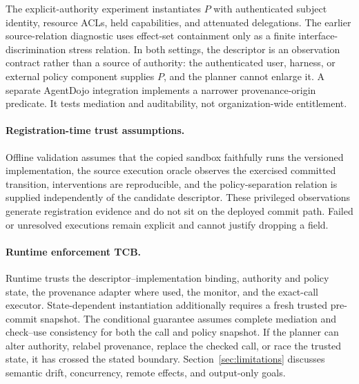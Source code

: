 The explicit-authority experiment instantiates $P$ with authenticated subject
identity, resource ACLs, held capabilities, and attenuated delegations. The
earlier source-relation diagnostic uses effect-set containment only as a finite
interface-discrimination stress relation. In both settings, the descriptor is
an observation contract rather than a source of authority: the authenticated
user, harness, or external policy component supplies $P$, and the planner
cannot enlarge it. A separate AgentDojo integration implements a narrower
provenance-origin predicate. It tests mediation and auditability, not
organization-wide entitlement.

\paragraph{Registration-time trust assumptions.}
Offline validation assumes that the copied sandbox faithfully runs the
versioned implementation, the source execution oracle observes the exercised
committed transition, interventions are reproducible, and the
policy-separation relation is supplied independently of the candidate
descriptor. These privileged observations generate registration evidence and
do not sit on the deployed commit path. Failed or unresolved executions remain
explicit and cannot justify dropping a field.

\paragraph{Runtime enforcement TCB.}
Runtime trusts the descriptor--implementation binding, authority and policy
state, the provenance adapter where used, the monitor, and the exact-call
executor. State-dependent instantiation additionally requires a fresh trusted
pre-commit snapshot. The conditional guarantee assumes complete mediation and
check--use consistency for both the call and policy snapshot. If the planner
can alter authority, relabel provenance, replace the checked call, or race the
trusted state, it has crossed the stated boundary. Section~\ref{sec:limitations}
discusses semantic drift, concurrency, remote effects, and output-only goals.
